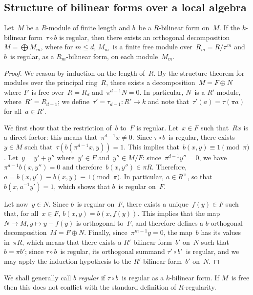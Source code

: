 \documentclass{article}%
\begin{document}
\subsection{Structure of bilinear forms over a local algebra}%
\begin{prop}\label{prop:diag-bigblock}%
Let~$M$ be a $R$-module of finite length and $b$~be a $R$-bilinear form
on~$M$.
If the $k$-bilinear form~$τ ∘ b$ is regular,
then there exists an orthogonal decomposition~$M = ⨁ M_m$,
where for $m ≤ d$, $M_m$~is a finite free module over~$R_m = R / π^m$
and $b$~is regular, as a $R_m$-bilinear form, on each module~$M_m$.
\end{prop}


\begin{proof}
We reason by induction on the length of~$R$. By the structure theorem for
modules over the principal ring~$R$, there exists a decomposition~$M = F
⊕ N$ where $F$~is free over~$R = R_d$ and~$π^{d-1} N = 0$. In
particular, $N$~is a $R'$-module, where~$R' = R_{d-1}$; we define~$τ'
= τ_{d-1}: R' → k$ and note that~$τ'(a) = τ(π a)$ for all~$a ∈ R'$.

We first show that the restriction of~$b$ to~$F$ is regular. Let~$x ∈ F$
such that~$R x$ is a direct factor: this means that~$π^{d-1} x ≠ 0$.
Since $τ ∘ b$~is regular, there exists~$y ∈ M$ such that~$τ(b(π^{d-1} x,
y)) = 1$. This implies that~$b(x, y) ≡ 1 \pmod{π}$. Let~$y = y' + y''$
where~$y' ∈ F$ and~$y'' ∈ M/F$: since~$π^{d-1} y'' = 0$, we have~$π^{d-1}
b(x, y'') = 0$ and therefore~$b(x, y'') ∈ π R$. Therefore, $a = b(x, y')
≡ b(x, y) ≡ 1 \pmod{π}$. In particular, $a ∈ R^{×}$, so that~$b(x, a^{-1}
y') = 1$, which shows that $b$~is regular on~$F$.

Let now~$y ∈ N$. Since $b$~is regular on~$F$, there exists a unique~$f(y)
∈ F$ such that, for all~$x ∈ F$, $b(x, y) = b(x, f(y))$. This implies
that the map~$N → M, y ↦ y - f(y)$ is orthogonal to~$F$, and therefore
defines a $b$-orthogonal decomposition~$M = F ⊕ N$. Finally,
since~$π^{m-1} y = 0$, the map~$b$ has its values in~$π R$, which means
that there exists a $R'$-bilinear form~$b'$ on~$N$ such that~$b = π b'$;
since $τ ∘ b$~is regular, its orthogonal summand $τ' ∘ b'$~is regular,
and we may apply the induction hypothesis to the $R'$-bilinear form~$b'$
on~$N$.
\end{proof}%

We shall generally call $b$ \emph{regular} if $τ ∘ b$~is regular as a
$k$-bilinear form. If $M$~is free then this does not conflict with the
standard definition of $R$-regularity.
\end{document}
